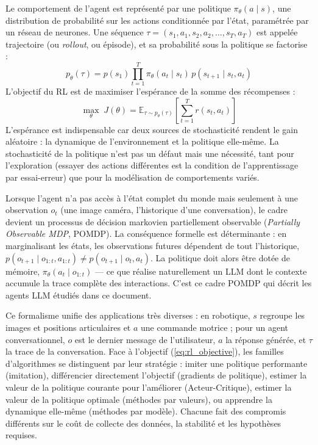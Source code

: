\documentclass[11pt,a4paper]{article}
\begin{document}
Le comportement de l'agent est représenté par une politique $\pi_\theta(a \mid s)$, une distribution de probabilité sur les actions conditionnée par l'état, paramétrée par un réseau de neurones. Une séquence $\tau = (s_1, a_1, s_2, a_2, \dots, s_T, a_T)$ est appelée trajectoire (ou \emph{rollout}, ou épisode), et sa probabilité sous la politique se factorise :
\begin{equation}
p_\theta(\tau) = p(s_1) \prod_{t=1}^{T} \pi_\theta(a_t \mid s_t)\, p(s_{t+1} \mid s_t, a_t)
\end{equation}
L'objectif du RL est de maximiser l'espérance de la somme des récompenses :
\begin{equation}
\max_\theta \; J(\theta) = \mathbb{E}_{\tau \sim p_\theta(\tau)} \left[ \sum_{t=1}^{T} r(s_t, a_t) \right]
\label{eq:rl_objective}
\end{equation}
L'espérance est indispensable car deux sources de stochasticité rendent le gain aléatoire : la dynamique de l'environnement et la politique elle-même. La stochasticité de la politique n'est pas un défaut mais une nécessité, tant pour l'exploration (essayer des actions différentes est la condition de l'apprentissage par essai-erreur) que pour la modélisation de comportements variés.

Lorsque l'agent n'a pas accès à l'état complet du monde mais seulement à une observation $o_t$ (une image caméra, l'historique d'une conversation), le cadre devient un processus de décision markovien partiellement observable (\emph{Partially Observable MDP}, POMDP). La conséquence formelle est déterminante : en marginalisant les états, les observations futures dépendent de tout l'historique, $p(o_{t+1} \mid o_{1:t}, a_{1:t}) \neq p(o_{t+1} \mid o_t, a_t)$. La politique doit alors être dotée de mémoire, $\pi_\theta(a_t \mid o_{1:t})$ — ce que réalise naturellement un LLM dont le contexte accumule la trace complète des interactions. C'est ce cadre POMDP qui décrit les agents LLM étudiés dans ce document.

Ce formalisme unifie des applications très diverses : en robotique, $s$ regroupe les images et positions articulaires et $a$ une commande motrice ; pour un agent conversationnel, $o$ est le dernier message de l'utilisateur, $a$ la réponse générée, et $\tau$ la trace de la conversation. Face à l'objectif (\ref{eq:rl_objective}), les familles d'algorithmes se distinguent par leur stratégie : imiter une politique performante (imitation), différencier directement l'objectif (gradients de politique), estimer la valeur de la politique courante pour l'améliorer (Acteur-Critique), estimer la valeur de la politique optimale (méthodes par valeurs), ou apprendre la dynamique elle-même (méthodes par modèle). Chacune fait des compromis différents sur le coût de collecte des données, la stabilité et les hypothèses requises.
\end{document}
